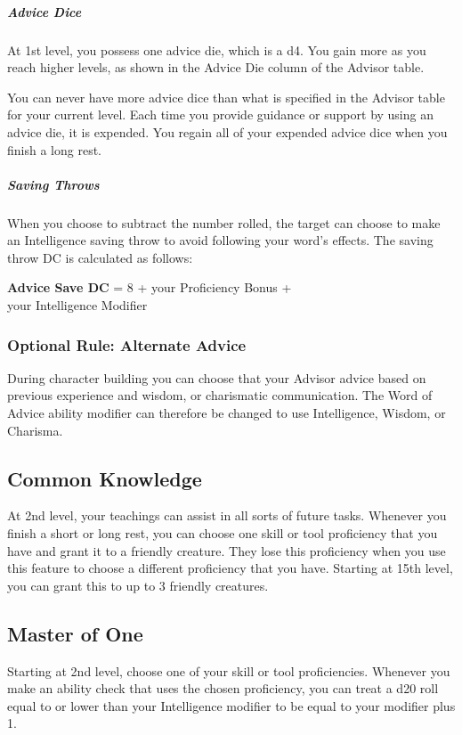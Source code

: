 \documentclass[letterpaper,openany,twoside,twocolumn]{book}
\begin{document}
	\subparagraph*{Advice Dice} At 1st level, you possess one advice die, which is a d4. You gain more as you reach higher levels, as shown in the Advice Die column of the Advisor table.
	
	You can never have more advice dice than what is specified in the Advisor table for your current level. Each time you provide guidance or support by using an advice die, it is expended. You regain all of your expended advice dice when you finish a long rest.
	
	\subparagraph*{Saving Throws} When you choose to subtract the number rolled, the target can choose to make an Intelligence saving throw to avoid following your word’s effects. The saving throw DC is calculated as follows:
	\begin{center}
		\textbf{Advice Save DC} = 8 + your Proficiency Bonus + \\your Intelligence Modifier
	\end{center}
	
	\subsubsection*{Optional Rule: Alternate Advice}
	During character building you can choose that your Advisor advice based on previous experience and wisdom, or charismatic communication. The Word of Advice ability modifier can therefore be changed to use Intelligence, Wisdom, or Charisma.
	
	\subsection*{Common Knowledge}
	At 2nd level, your teachings can assist in all sorts of future tasks. Whenever you finish a short or long rest, you can choose one skill or tool proficiency that you have and grant it to a friendly creature. They lose this proficiency when you use this feature to choose a different proficiency that you have. Starting at 15th level, you can grant this to up to 3 friendly creatures.
	
	\subsection*{Master of One}
	Starting at 2nd level, choose one of your skill or tool proficiencies. Whenever you make an ability check that uses the chosen proficiency, you can treat a d20 roll equal to or lower than your Intelligence modifier to be equal to your modifier plus 1.
	
\end{document}
